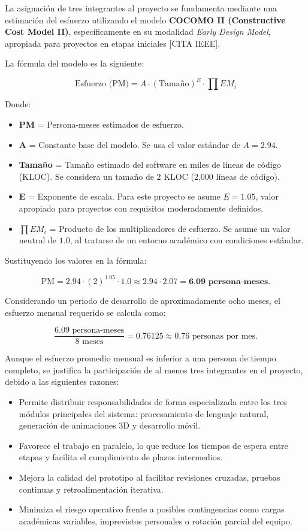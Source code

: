 La asignación de tres integrantes al proyecto se fundamenta mediante una estimación del esfuerzo utilizando el modelo \textbf{COCOMO II (Constructive Cost Model II)}, específicamente en su modalidad \textit{Early Design Model}, apropiada para proyectos en etapas iniciales [CITA IEEE].

La fórmula del modelo es la siguiente:

\[
\text{Esfuerzo (PM)} = A \cdot (\text{Tamaño})^E \cdot \prod EM_i
\]

Donde:

\begin{itemize}
	\item \textbf{PM} = Persona-meses estimados de esfuerzo.
	\item \textbf{A} = Constante base del modelo. Se usa el valor estándar de $A = 2.94$.
	\item \textbf{Tamaño} = Tamaño estimado del software en miles de líneas de código (KLOC). Se considera un tamaño de $2$ KLOC (2,000 líneas de código).
	\item \textbf{E} = Exponente de escala. Para este proyecto se asume $E = 1.05$, valor apropiado para proyectos con requisitos moderadamente definidos.
	\item $\prod EM_i$ = Producto de los multiplicadores de esfuerzo. Se asume un valor neutral de $1.0$, al tratarse de un entorno académico con condiciones estándar.
\end{itemize}

Sustituyendo los valores en la fórmula:

\[
\text{PM} = 2.94 \cdot (2)^{1.05} \cdot 1.0 \approx 2.94 \cdot 2.07 = \textbf{6.09 persona-meses.}
\]

Considerando un periodo de desarrollo de aproximadamente ocho meses, el esfuerzo mensual requerido se calcula como:

\[
\frac{6.09 \text{ persona-meses}}{8 \text{ meses}} = \num{0.76125} \approx \num{0.76} \text{ personas por mes.}
\]

Aunque el esfuerzo promedio mensual es inferior a una persona de tiempo completo, se justifica la participación de al menos tres integrantes en el proyecto, debido a las siguientes razones:

\begin{itemize}
	\item Permite distribuir responsabilidades de forma especializada entre los tres módulos principales del sistema: procesamiento de lenguaje natural, generación de animaciones 3D y desarrollo móvil.
	\item Favorece el trabajo en paralelo, lo que reduce los tiempos de espera entre etapas y facilita el cumplimiento de plazos intermedios.
	\item Mejora la calidad del prototipo al facilitar revisiones cruzadas, pruebas continuas y retroalimentación iterativa.
	\item Minimiza el riesgo operativo frente a posibles contingencias como cargas académicas variables, imprevistos personales o rotación parcial del equipo.
\end{itemize}


